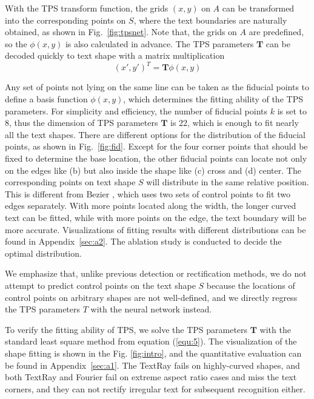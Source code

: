 \documentclass[sigconf]{acmart}
\begin{document}
	
	With the TPS transform function, 
	the grids $(x,y)$ on $A$ can be  transformed into the corresponding points on $S$, where the text boundaries are naturally obtained, 
	as shown in Fig.~\ref{fig:tpsnet}. Note that, the grids on $A$ are  predefined, so the $\phi(x,y)$ is also calculated in advance. The TPS parameters $\mathbf{T}$ can be decoded quickly to text shape with a matrix multiplication 
	\begin{equation}
	(x',y')^T = \textbf{T} \phi(x,y)
	\label{equ:5}
	\end{equation}
	
	
	Any set of points not lying on the same line can be taken as the fiducial points to define a basis function $\phi(x,y)$, which determines the fitting ability of the TPS parameters. For simplicity and efficiency, the number of fiducial points $k$ is set to 8, thus the dimension of TPS parameters $\mathbf{T}$ is 22, which is enough to fit nearly all the text shapes. There are different options for the distribution of the fiducial points, as shown in Fig.~\ref{fig:fid}. Except for the four corner points that should be fixed to determine the base location, the other fiducial points can locate not only on the edges like (b) but also inside the shape like (c) cross and (d) center. The corresponding points on text shape $S$ 
	will distribute in the same relative position. This is different from Bezier \cite{Liu2020ABCNet}, which uses two sets of control points to fit two edges separately. 
	With more points located along the width, the longer curved text can be fitted, while with more points on the edge, the text boundary will be more accurate. Visualizations of fitting results with different distributions can be found in Appendix~\ref{sec:a2}. The ablation study is conducted to decide the optimal distribution.
	
	We emphasize that, unlike previous detection or rectification methods, we do not attempt to predict control points on the text shape $S$ because the locations of control points on arbitrary shapes are not well-defined, 
	and we directly regress the TPS parameters $T$ with the neural network instead.
	
	
	To verify the fitting ability of TPS,
	we solve the TPS parameters $\mathbf{T}$ with the standard least square method from equation (\ref{equ:5}).
	The visualization of the shape fitting is shown in the Fig. \ref{fig:intro}, and the quantitative evaluation can be found in Appendix~\ref{sec:a1}. The TextRay \cite{Wang2020textray} fails on highly-curved shapes, and both TextRay \cite{Wang2020textray} and Fourier \cite{zhu2021fourier} fail on extreme aspect ratio cases and miss the text corners, and they can not rectify irregular text for subsequent recognition either.
	
\end{document}
